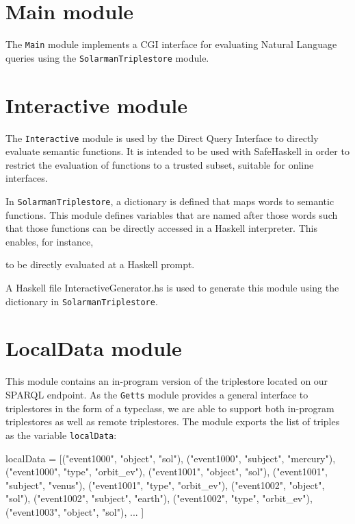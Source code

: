 \documentclass[../main.tex]{subfiles}
\begin{document}
\section{Main module}

The \texttt{Main} module implements a CGI interface for evaluating Natural Language queries using the \texttt{SolarmanTriplestore} module.

\section{Interactive module}

The \texttt{Interactive} module is used by the Direct Query Interface to directly evaluate semantic functions.  It is intended to be used with SafeHaskell
in order to restrict the evaluation of functions to a trusted subset, suitable for online interfaces.

In \texttt{SolarmanTriplestore}, a dictionary is defined that maps words to semantic functions.  This module defines variables that are named
after those words such that those functions can be directly accessed in a Haskell interpreter.  This enables, for instance,


to be directly evaluated at a Haskell prompt.

A Haskell file InteractiveGenerator.hs is used to generate this module using the dictionary in \texttt{SolarmanTriplestore}.

\section{LocalData module}

This module contains an in-program version of the triplestore located on our SPARQL endpoint.  As the \texttt{Getts} module provides
a general interface to triplestores in the form of a typeclass, we are able to support both in-program triplestores as well as remote triplestores.
The module exports the list of triples as the variable \texttt{localData}:

\begin{code}
localData = [("event1000", "object", "sol"),
("event1000", "subject", "mercury"),
("event1000", "type", "orbit_ev"),
("event1001", "object", "sol"),
("event1001", "subject", "venus"),
("event1001", "type", "orbit_ev"),
("event1002", "object", "sol"),
("event1002", "subject", "earth"),
("event1002", "type", "orbit_ev"),
("event1003", "object", "sol"),
... ]
\end{code}
\end{document}
